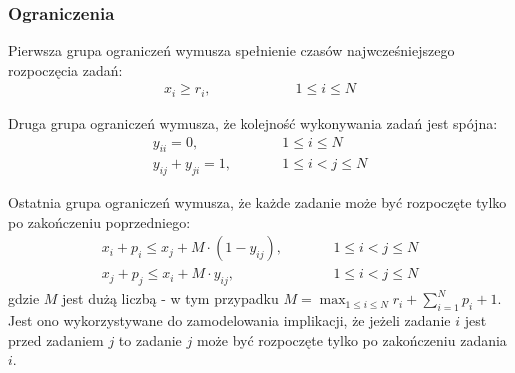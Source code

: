 \documentclass{article}
\begin{document}
\subsubsection{Ograniczenia}
Pierwsza grupa ograniczeń wymusza spełnienie czasów najwcześniejszego rozpoczęcia zadań:
\begin{align*}
    x_i \geq r_i, \qquad \qquad \qquad 1 \leq i \leq N
\end{align*}

Druga grupa ograniczeń wymusza, że kolejność wykonywania zadań jest spójna:
\begin{align*}
    y_{ii} = 0, \qquad &&1 \leq i \leq N \\
    y_{ij} + y_{ji} = 1, \qquad &&1 \leq i<j \leq N
\end{align*}

Ostatnia grupa ograniczeń wymusza, że każde zadanie może być rozpoczęte tylko po zakończeniu poprzedniego:
\begin{align*}
    x_i + p_i \leq x_j + M \cdot (1 - y_{ij}), \qquad &&1 \leq i<j \leq N \\
    x_j + p_j \leq x_i + M \cdot y_{ij}, \qquad &&1 \leq i<j \leq N
\end{align*}
gdzie $M$ jest dużą liczbą - w tym przypadku $ \displaystyle M = \max_{1 \leq i \leq N}{r_i} + \sum_{i=1}^{N} p_i + 1$.
Jest ono wykorzystywane do zamodelowania implikacji, że jeżeli zadanie $i$ jest przed zadaniem $j$ to zadanie $j$ może być rozpoczęte tylko po zakończeniu zadania $i$.

\newpage
\end{document}
